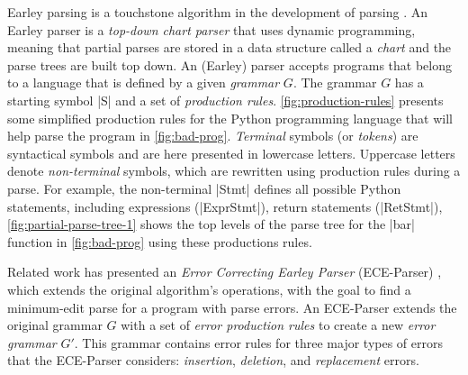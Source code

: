  Earley parsing is a touchstone
algorithm in the development of parsing \citep{Earley_1970}. An Earley parser is a
\emph{top-down chart parser} that uses dynamic programming, meaning that partial
parses are stored in a data structure called a \emph{chart} and the parse trees
are built top down. An (Earley) parser accepts programs that belong to a
language that is defined by a given \emph{grammar} $G$. The grammar $G$ has a
starting symbol |S| and a set of \emph{production rules}.
\autoref{fig:production-rules} presents some simplified production rules for the
Python programming language that will help parse the program in
\autoref{fig:bad-prog}. \emph{Terminal} symbols (or \emph{tokens}) are
syntactical symbols and are here presented in lowercase
letters. Uppercase letters denote \emph{non-terminal} symbols, which are
rewritten using production rules during a parse.
For example, the non-terminal |Stmt| defines all
possible Python statements, including expressions (|ExprStmt|), return statements
(|RetStmt|), \etc \autoref{fig:partial-parse-tree-1} shows the top levels of
the parse tree for the |bar| function in \autoref{fig:bad-prog} using these
productions rules.

%

 Related work has presented an \emph{Error
Correcting Earley Parser} (ECE-Parser) \citep{Aho_1972},
which extends the original algorithm's operations, with the goal to find a
minimum-edit parse for a program with parse errors. An ECE-Parser extends the
original grammar $G$ with a set of \emph{error production rules} to create a new
\emph{error grammar} $G'$. This grammar contains error rules for three major
types of errors that the ECE-Parser considers: \emph{insertion},
\emph{deletion}, and \emph{replacement} errors.

